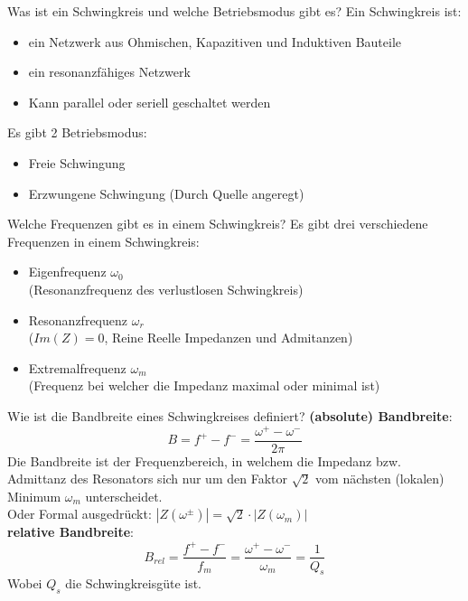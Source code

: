 
\begin{karte}{Was ist ein Schwingkreis und welche Betriebsmodus gibt es?}
	Ein Schwingkreis ist:\\
	\begin{itemize}
		\item ein Netzwerk aus Ohmischen, Kapazitiven und Induktiven Bauteile
		\item ein resonanzfähiges Netzwerk
		\item Kann parallel oder seriell geschaltet werden
	\end{itemize}
	Es gibt 2 Betriebsmodus:
	\begin{itemize}
		\item Freie Schwingung 
		\item Erzwungene Schwingung (Durch Quelle angeregt)
	\end{itemize}
\end{karte}

\begin{karte}{Welche Frequenzen gibt es in einem Schwingkreis?}
	Es gibt drei verschiedene Frequenzen in einem Schwingkreis:
	\begin{itemize}
		\item Eigenfrequenz $\omega_0$\\
		(Resonanzfrequenz des verlustlosen Schwingkreis)
		\item Resonanzfrequenz $\omega_r$\\
		($Im(Z) = 0$, Reine Reelle Impedanzen und Admitanzen)
		\item Extremalfrequenz $\omega_m$\\
		(Frequenz bei welcher die Impedanz maximal oder minimal ist)
	\end{itemize}
\end{karte}

\begin{karte}{Wie ist die Bandbreite eines Schwingkreises definiert?}
	\textbf{(absolute) Bandbreite}:
	\begin{equation*}
		B = f^+ - f^- = \dfrac{\omega^+ - \omega^-}{2 \pi}
	\end{equation*}
	Die Bandbreite ist der Frequenzbereich, in welchem die Impedanz bzw. Admittanz des Resonators sich nur um den Faktor $\sqrt{2}$ vom nächsten (lokalen) Minimum $\omega_m$ unterscheidet.\\
	Oder Formal ausgedrückt: \quad $|Z (\omega^{\pm})|=\sqrt{2}\cdot|Z(\omega_{m})|$\\
	\textbf{relative Bandbreite}:
	\begin{equation*}
	B_{rel} = \frac{f^+ - f^-}{f_m} = \frac{\omega^+ - \omega^-}{\omega_m} =\frac{1}{Q_s}
	\end{equation*}
	Wobei $Q_s$ die Schwingkreisgüte ist.
\end{karte}

